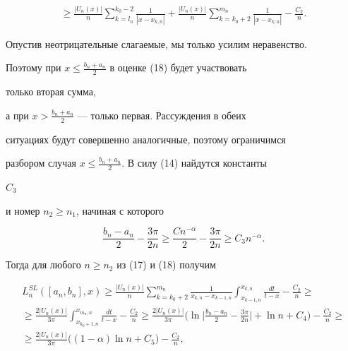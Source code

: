 \begin{pf}
\begin{multline}
% 


\ge\frac{|U_n(x)|}{n}\sum^{k_0-2}_{k=l_n} 


\frac{1}{|x-x_{k,n}|}+\frac{|U_n(x)|}{n} 


\sum^{m_n}_{k=k_0+2}\frac{1}{|x-x_{k,n}|}-\frac{C_2}{n}. 


\end{multline} 


Опустив неотрицательные слагаемые, мы только усилим неравенство. 


Поэтому при $x\le\frac{b_n+a_n}{2}$ в оценке (18) будет участвовать 


только вторая сумма, 


а при $x>\frac{b_n+a_n}{2}$ --- только первая. Рассуждения в обеих 


ситуациях будут совершенно аналогичные, поэтому ограничимся 


разбором случая $x\le\frac{b_n+a_n}{2}$. В силу (14) найдутся константы 


$C_3$ 


и номер $n_2\ge n_1$, начиная с которого 


$$ 


\frac{b_n-a_n}{2}-\frac{3\pi}{2n}\ge 


\frac{C n^{-\alpha}}{2}-\frac{3\pi}{2n}\ge C_3n^{-\alpha}. 


$$ 


Тогда для любого $n\ge n_2$ из (17) и (18) получим 


\begin{multline*} 


L^{SL}_n([a_n,b_n],x)\ge\frac{|U_n(x)|}{n} 


\sum^{m_n}_{k=k_0+2}\frac{1}{x_{k,n}-x_{k-1,n}} 


\int^{x_{k,n}}_{x_{k-1,n}}\frac{dt}{t-x}-\frac{C_2}{n}\ge \\ 


% 


\ge\frac{2|U_n(x)|}{3\pi}\int^{x_{m_n,n}}_{x_{k_0+1,n}} 


\frac{dt}{t-x}-\frac{C_2}{n}\ge\frac{2|U_n(x)|}{3\pi}\bigg(\ln 


\bigg|\frac{b_n-a_n}{2}-\frac{3\pi}{2n}\bigg|+\ln n+C_4\bigg)- 


\frac{C_2}{n}\ge \\ 


% 


\ge \frac{2|U_n(x)|}{3\pi}\big((1-\alpha)\ln n+C_5\big)- 


\frac{C_2}{n}, 



\end{multline*}
\end{pf}
